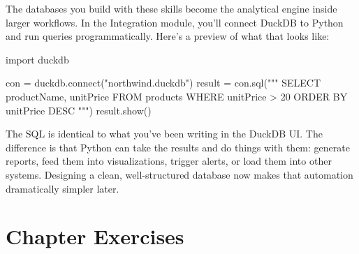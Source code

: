 \documentclass[
  letterpaper,
  DIV=11,
  numbers=noendperiod]{scrreprt}
\newenvironment{Shaded}{\begin{snugshade}}{\end{snugshade}}
\newcommand{\ExtensionTok}[1]{\textcolor[rgb]{0.00,0.23,0.31}{#1}}
\newcommand{\ImportTok}[1]{\textcolor[rgb]{0.00,0.46,0.62}{#1}}
\newcommand{\NormalTok}[1]{\textcolor[rgb]{0.00,0.23,0.31}{#1}}
\newcommand{\OperatorTok}[1]{\textcolor[rgb]{0.37,0.37,0.37}{#1}}
\newcommand{\StringTok}[1]{\textcolor[rgb]{0.13,0.47,0.30}{#1}}
\begin{document}
\begin{tcolorbox}[enhanced jigsaw, opacitybacktitle=0.6, arc=.35mm, colback=white, bottomtitle=1mm, opacityback=0, toprule=.15mm, left=2mm, colbacktitle=quarto-callout-note-color!10!white, breakable, coltitle=black, toptitle=1mm, colframe=quarto-callout-note-color-frame, bottomrule=.15mm, titlerule=0mm, title=\textcolor{quarto-callout-note-color}{\faInfo}\hspace{0.5em}{Looking Ahead: Connecting DuckDB to Python}, rightrule=.15mm, leftrule=.75mm]

The databases you build with these skills become the analytical engine
inside larger workflows. In the Integration module, you'll connect
DuckDB to Python and run queries programmatically. Here's a preview of
what that looks like:

\begin{codelisting}[H]

\caption{\texttt{python}}

\begin{Shaded}
\begin{Highlighting}[]
\ImportTok{import}\NormalTok{ duckdb}

\NormalTok{con }\OperatorTok{=}\NormalTok{ duckdb.}\ExtensionTok{connect}\NormalTok{(}\StringTok{"northwind.duckdb"}\NormalTok{)}
\NormalTok{result }\OperatorTok{=}\NormalTok{ con.sql(}\StringTok{"""}
\StringTok{    SELECT productName, unitPrice}
\StringTok{    FROM products}
\StringTok{    WHERE unitPrice \textgreater{} 20}
\StringTok{    ORDER BY unitPrice DESC}
\StringTok{"""}\NormalTok{)}
\NormalTok{result.show()}
\end{Highlighting}
\end{Shaded}

\end{codelisting}

The SQL is identical to what you've been writing in the DuckDB UI. The
difference is that Python can take the results and do things with them:
generate reports, feed them into visualizations, trigger alerts, or load
them into other systems. Designing a clean, well-structured database now
makes that automation dramatically simpler later.

\end{tcolorbox}

\section{Chapter Exercises}\label{chapter-exercises-4}
\end{document}
